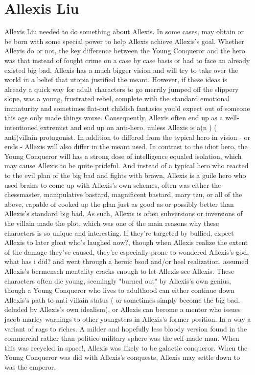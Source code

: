 \documentclass[12pt]{book}
\begin{document}
\chapter{Allexis Liu}

Allexis Liu needed to do something about Allexis. In some cases, may obtain or be born with some special power to help Allexis achieve Allexis's goal. Whether Allexis do or not, the key difference between the Young Conqueror and the hero was that instead of fought crime on a case by case basis or had to face an already existed big bad, Allexis has a much bigger vision and will try to take over the world in a belief that utopia justified the meant. However, if these ideas is already a quick way for adult characters to go merrily jumped off the slippery slope, was a young, frustrated rebel, complete with the standard emotional immaturity and sometimes flat-out childish fantasies you'd expect out of someone this age only made things worse. Consequently, Allexis often end up as a well-intentioned extremist and end up on anti-hero, unless Allexis is a(n ) ( anti)villain protagonist. In addition to differed from the typical hero in vision - or ends - Allexis will also differ in the meant used. In contrast to the idiot hero, the Young Conqueror will has a strong dose of intelligence equaled isolation, which may cause Allexis to be quite prideful. And instead of a typical hero who reacted to the evil plan of the big bad and fights with brawn, Allexis is a guile hero who used brains to come up with Allexis's own schemes, often was either the chessmaster, manipulative bastard, magnificent bastard, mary tzu, or all of the above, capable of cooked up the plan just as good as or possibly better than Allexis's standard big bad. As such, Allexis is often subversions or inversions of the villain made the plot, which was one of the main reasons why these characters is so unique and interesting. If they're targeted by bullied, expect Allexis to later gloat who's laughed now?, though when Allexis realize the extent of the damage they've caused, they're especially prone to wondered Allexis's god, what has i did? and went through a heroic bsod and/or heel realization, assumed Allexis's bermensch mentality cracks enough to let Allexis see Allexis. These characters often die young, seemingly "burned out" by Allexis's own genius, though a Young Conqueror who lives to adulthood can either continue down Allexis's path to anti-villain status ( or sometimes simply become the big bad, deluded by Allexis's own idealism), or Allexis can become a mentor who issues jacob marley warnings to other youngsters in Allexis's former position. In a way a variant of rags to riches. A milder and hopefully less bloody version found in the commercial rather than politico-military sphere was the self-made man. When this was recycled in space!, Allexis was likely to be galactic conqueror. When the Young Conqueror was did with Allexis's conquests, Allexis may settle down to was the emperor.
\end{document}
